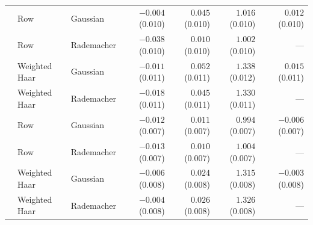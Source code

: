 \begin{tabular}{@{}rllrrrr@{}}
\addlinespace[3pt]
256 & Row & Gaussian & $-0.004$ (0.010) & $0.045$ (0.010) & $1.016$ (0.010) & $0.012$ (0.010) \\
 & Row & Rademacher & $-0.038$ (0.010) & $0.010$ (0.010) & $1.002$ (0.010) & --- \\
 & Weighted Haar & Gaussian & $-0.011$ (0.011) & $0.052$ (0.011) & $1.338$ (0.012) & $0.015$ (0.011) \\
 & Weighted Haar & Rademacher & $-0.018$ (0.011) & $0.045$ (0.011) & $1.330$ (0.011) & --- \\
\addlinespace[3pt]
512 & Row & Gaussian & $-0.012$ (0.007) & $0.011$ (0.007) & $0.994$ (0.007) & $-0.006$ (0.007) \\
 & Row & Rademacher & $-0.013$ (0.007) & $0.010$ (0.007) & $1.004$ (0.007) & --- \\
 & Weighted Haar & Gaussian & $-0.006$ (0.008) & $0.024$ (0.008) & $1.315$ (0.008) & $-0.003$ (0.008) \\
 & Weighted Haar & Rademacher & $-0.004$ (0.008) & $0.026$ (0.008) & $1.326$ (0.008) & --- \\
\bottomrule
\end{tabular}
